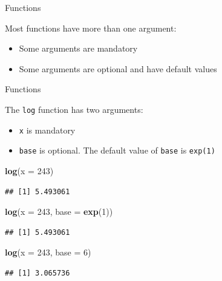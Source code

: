 \documentclass[ignorenonframetext,]{beamer}
\newenvironment{Shaded}{\begin{snugshade}}{\end{snugshade}}
\newcommand{\DataTypeTok}[1]{\textcolor[rgb]{0.13,0.29,0.53}{#1}}
\newcommand{\DecValTok}[1]{\textcolor[rgb]{0.00,0.00,0.81}{#1}}
\newcommand{\KeywordTok}[1]{\textcolor[rgb]{0.13,0.29,0.53}{\textbf{#1}}}
\newcommand{\NormalTok}[1]{#1}
\begin{document}
\begin{frame}{Functions}
\protect\hypertarget{functions-1}{}

Most functions have more than one argument:

\begin{itemize}
\item
  Some arguments are mandatory
\item
  Some arguments are optional and have default values
\end{itemize}

\end{frame}

\begin{frame}[fragile]{Functions}
\protect\hypertarget{functions-2}{}

The \texttt{log} function has two arguments:

\begin{itemize}
\item
  \texttt{x} is mandatory
\item
  \texttt{base} is optional. The default value of \texttt{base} is
  \texttt{exp(1)}
\end{itemize}

\begin{Shaded}
\begin{Highlighting}[]
\KeywordTok{log}\NormalTok{(}\DataTypeTok{x =} \DecValTok{243}\NormalTok{)}
\end{Highlighting}
\end{Shaded}

\begin{verbatim}
## [1] 5.493061
\end{verbatim}

\begin{Shaded}
\begin{Highlighting}[]
\KeywordTok{log}\NormalTok{(}\DataTypeTok{x =} \DecValTok{243}\NormalTok{, }\DataTypeTok{base =} \KeywordTok{exp}\NormalTok{(}\DecValTok{1}\NormalTok{))}
\end{Highlighting}
\end{Shaded}

\begin{verbatim}
## [1] 5.493061
\end{verbatim}

\begin{Shaded}
\begin{Highlighting}[]
\KeywordTok{log}\NormalTok{(}\DataTypeTok{x =} \DecValTok{243}\NormalTok{, }\DataTypeTok{base =} \DecValTok{6}\NormalTok{)}
\end{Highlighting}
\end{Shaded}

\begin{verbatim}
## [1] 3.065736
\end{verbatim}

\end{frame}
\end{document}
